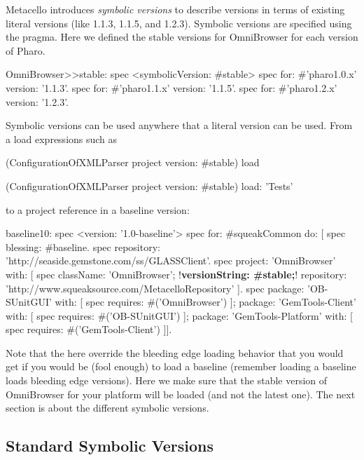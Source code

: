 \documentclass[a4paper,10pt,twoside]{book}
\begin{document}
Metacello introduces \emph{symbolic versions} to describe versions in terms of existing literal versions (like 1.1.3, 1.1.5, and 1.2.3). Symbolic versions are specified using the  pragma. Here we defined the stable versions for OmniBrowser for each version of Pharo.

\begin{code}{}
OmniBrowser>>stable: spec
     <symbolicVersion: #stable>
     spec for: #'pharo1.0.x' version: '1.1.3'.
     spec for: #'pharo1.1.x' version: '1.1.5'.
     spec for: #'pharo1.2.x' version: '1.2.3'.
\end{code}

Symbolic versions can be used anywhere that a literal version can be used. From a load expressions such as

\begin{code}{}
(ConfigurationOfXMLParser project version: #stable) load

(ConfigurationOfXMLParser project version: #stable) load: 'Tests'
\end{code}

to a project reference in a baseline version:

\begin{code}{}
baseline10: spec
     <version: '1.0-baseline'>
     spec for: #squeakCommon do: [
          spec blessing: #baseline.
          spec repository: 'http://seaside.gemstone.com/ss/GLASSClient'.
     spec
          project: 'OmniBrowser' with: [
          spec
               className: 'OmniBrowser';
               !\textbf{versionString: \#stable;}!
               repository: 'http://www.squeaksource.com/MetacelloRepository' ].
     spec
         package: 'OB-SUnitGUI' with: [
               spec requires: #('OmniBrowser') ];
         package: 'GemTools-Client' with: [
               spec requires: #('OB-SUnitGUI') ];
         package: 'GemTools-Platform' with: [
               spec requires: #('GemTools-Client') ]].
\end{code}

Note that the  here override the bleeding edge loading behavior that you would get if you would be (fool enough) to load a baseline (remember loading a baseline loads bleeding edge versions). Here we make sure that the stable version of OmniBrowser for your platform will be loaded (and not the latest one). The next section is about the different symbolic versions.





\subsection{Standard Symbolic Versions}
\end{document}
